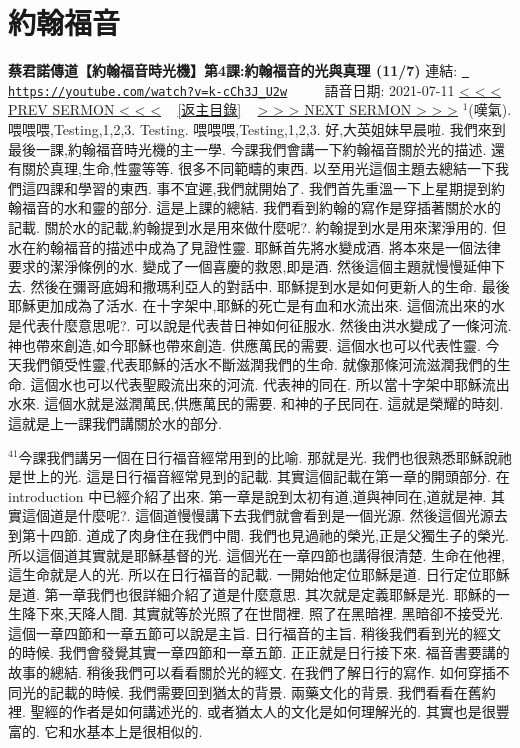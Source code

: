 \documentclass{book}
\begin{document}
\section{約翰福音}
\label{sec:k_cCh3J_U2w}
\textbf{蔡君諾傳道【約翰福音時光機】第4課:約翰福音的光與真理 (11/7)}
\newline
\newline
連結: \href{https://youtube.com/watch?v=k-cCh3J_U2w}{\texttt{ https://youtube.com/watch?v=k-cCh3J\_U2w}} ~~~~ 語音日期: 2021-07-11 
\newline
\newline
\hyperref[sec:V9Yc8B3k4jI]{\small{< < < PREV SERMON < < <}}
~
\hyperref[sec:index]{\small{[返主目錄]}}
~
\hyperref[sec:MrgiW6jGDH4]{\small{> > > NEXT SERMON > > >}}
\newline
\newline
$^{1}$(嘆氣).
喂喂喂,Testing,1,2,3.
Testing.
喂喂喂,Testing,1,2,3.
好,大英姐妹早晨啦.
我們來到最後一課,約翰福音時光機的主一學.
今課我們會講一下約翰福音關於光的描述.
還有關於真理,生命,性靈等等.
很多不同範疇的東西.
以至用光這個主題去總結一下我們這四課和學習的東西.
事不宜遲,我們就開始了.
我們首先重溫一下上星期提到約翰福音的水和靈的部分.
這是上課的總結.
我們看到約翰的寫作是穿插著關於水的記載.
關於水的記載,約翰提到水是用來做什麼呢?.
約翰提到水是用來潔淨用的.
但水在約翰福音的描述中成為了見證性靈.
耶穌首先將水變成酒.
將本來是一個法律要求的潔淨條例的水.
變成了一個喜慶的救恩,即是酒.
然後這個主題就慢慢延伸下去.
然後在彌哥底姆和撒瑪利亞人的對話中.
耶穌提到水是如何更新人的生命.
最後耶穌更加成為了活水.
在十字架中,耶穌的死亡是有血和水流出來.
這個流出來的水是代表什麼意思呢?.
可以說是代表昔日神如何征服水.
然後由洪水變成了一條河流.
神也帶來創造,如今耶穌也帶來創造.
供應萬民的需要.
這個水也可以代表性靈.
今天我們領受性靈,代表耶穌的活水不斷滋潤我們的生命.
就像那條河流滋潤我們的生命.
這個水也可以代表聖殿流出來的河流.
代表神的同在.
所以當十字架中耶穌流出水來.
這個水就是滋潤萬民,供應萬民的需要.
和神的子民同在.
這就是榮耀的時刻.
這就是上一課我們講關於水的部分.

$^{41}$今課我們講另一個在日行福音經常用到的比喻.
那就是光.
我們也很熟悉耶穌說祂是世上的光.
這是日行福音經常見到的記載.
其實這個記載在第一章的開頭部分.
在introduction 中已經介紹了出來.
第一章是說到太初有道,道與神同在,道就是神.
其實這個道是什麼呢?.
這個道慢慢講下去我們就會看到是一個光源.
然後這個光源去到第十四節.
道成了肉身住在我們中間.
我們也見過祂的榮光,正是父獨生子的榮光.
所以這個道其實就是耶穌基督的光.
這個光在一章四節也講得很清楚.
生命在他裡,這生命就是人的光.
所以在日行福音的記載.
一開始他定位耶穌是道.
日行定位耶穌是道.
第一章我們也很詳細介紹了道是什麼意思.
其次就是定義耶穌是光.
耶穌的一生降下來,天降人間.
其實就等於光照了在世間裡.
照了在黑暗裡.
黑暗卻不接受光.
這個一章四節和一章五節可以說是主旨.
日行福音的主旨.
稍後我們看到光的經文的時候.
我們會發覺其實一章四節和一章五節.
正正就是日行接下來.
福音書要講的故事的總結.
稍後我們可以看看關於光的經文.
在我們了解日行的寫作.
如何穿插不同光的記載的時候.
我們需要回到猶太的背景.
兩藥文化的背景.
我們看看在舊約裡.
聖經的作者是如何講述光的.
或者猶太人的文化是如何理解光的.
其實也是很豐富的.
它和水基本上是很相似的.
\end{document}
